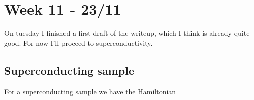 \section{Week 11 - 23/11}
On tuesday I finished a first draft of the writeup, which I think is already quite good. For now I'll proceed to superconductivity. 
\subsection{Superconducting sample}
For a superconducting sample we have the Hamiltonian

    
